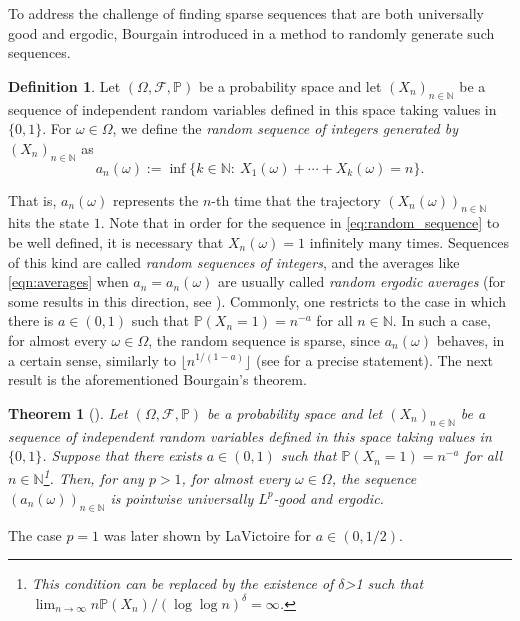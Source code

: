 \documentclass[11pt]{amsart}
\numberwithin{equation}{section}
\newtheorem{theorem}[lemma]{Theorem}
\theoremstyle{definition}
\newtheorem{definition}[lemma]{Definition}
\theoremstyle{plain}
\newcommand{\N}{{\mathbb N}}
\begin{document}
To address the challenge of finding sparse sequences that are both universally good and ergodic, Bourgain introduced in \cite{Bourgain1988} a method to randomly generate such sequences.  
\begin{definition}
    Let $(\Omega,\mathcal{F},\mathbb{P})$ be a probability space and let $(X_n)_{n\in \N}$ be a sequence of independent random variables defined in this space taking values in $\{0,1\}$. For $\omega\in \Omega$, we define the \emph{random sequence of integers generated by $(X_n)_{n\in \N}$} as
    \begin{equation}
        a_n(\omega):=\inf \Big\{k\in \N:\ X_1(\omega)+\cdots+X_k(\omega)=n\Big\}.\label{eq:random_sequence}
    \end{equation}\label{def:random_sequence}
\end{definition}
That is, $a_n(\omega)$ represents the $n$-th time that the trajectory $(X_n(\omega))_{n\in\N}$ hits the state $1$. Note that in order for the sequence in \eqref{eq:random_sequence} to be well defined, it is necessary that $X_n(\omega)=1$ infinitely many times.
Sequences of this kind are called \emph{random sequences of integers}, and the averages like \eqref{eqn:averages} when $a_n=a_n(\omega)$ are usually called \emph{random ergodic averages} (for some results in this direction, see \cite{Frantzikinakis_Lesigne_Wierdl,Frantzikinakis_Lesigne_Wierdl_Szemeredi,Krause_ZorinKranich_1,Krause_ZorinKranich_2,Rosenblatt}). 
Commonly, one restricts to the case in which there is $a\in (0,1)$ such that $\mathbb{P}(X_n=1)=n^{-a}$ for all $n\in \N$. 
In such a case, for almost every $\omega\in \Omega$, the random sequence is sparse, since  $a_n(\omega)$ behaves, in a certain sense, similarly to $\lfloor n^{1/(1-a)}\rfloor$ (see \cite[Lemma A.6]{Frantzikinakis_Lesigne_Wierdl} for a precise statement).
The next result is the aforementioned Bourgain's theorem. 
\begin{theorem}[\cite{Bourgain1988}]
     Let $(\Omega,\mathcal{F},\mathbb{P})$ be a probability space and let $(X_n)_{n\in \N}$ be a sequence of independent random variables defined in this space taking values in $\{0,1\}$. Suppose that there exists $a\in (0,1)$ such that $\mathbb{P}(X_n=1)=n^{-a}$ for all $n\in \N$\footnote{This condition can be replaced by the existence of $\delta$>1 such that $\lim_{n\to \infty}n\mathbb{P}(X_n)/(\log \log n)^\delta=\infty$.}.  Then, for any $p>1$, for almost every $\omega \in \Omega$, the sequence $(a_n(\omega))_{n\in \N}$ is pointwise universally $L^p$-good and ergodic.\label{thm:random_ergodic_averages}
\end{theorem}
The case $p=1$ was later shown by LaVictoire \cite{LaVictoire} for $a\in (0,1/2)$. 
\medskip
\end{document}
